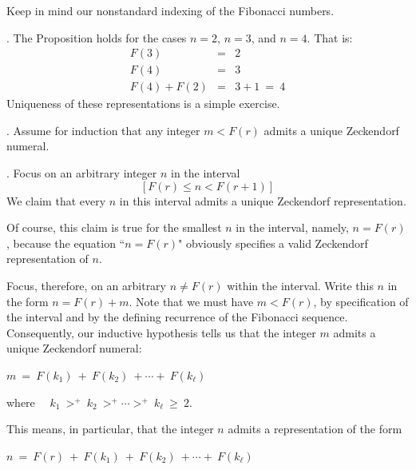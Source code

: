\smallskip

Keep in mind our nonstandard indexing of the Fibonacci numbers.

\medskip

.
The Proposition holds for the cases $n=2$, $n=3$, and $n=4$.  That is:
\begin{eqnarray*}
F(3) & = & 2 \\
F(4) & = & 3 \\
F(4) + F(2) & = & 3 + 1 \ = \ 4
\end{eqnarray*}
Uniqueness of these representations is a simple exercise.

\medskip

.
Assume for induction that any integer $m < F(r)$ admits a unique Zeckendorf numeral.

\medskip

.
Focus on an arbitrary integer $n$ in the interval
\[ [F(r) \leq n < F(r+1)] \]
We claim that every $n$ in this interval admits a unique Zeckendorf representation.

\smallskip

Of course, this claim is true for the smallest $n$ in the interval, namely, $n=F(r)$, because the equation ``$n=F(r)$" obviously specifies a valid Zeckendorf representation of $n$.

\smallskip

Focus, therefore, on an arbitrary $n \neq F(r)$ within the interval.  Write this $n$ in the form $n = F(r) + m$.  Note that we must have $m < F(r)$, by specification of the interval and by the defining recurrence of the Fibonacci sequence.  Consequently, our inductive hypothesis tells us that the integer $m$ admits a unique Zeckendorf numeral:

\smallskip

\hspace*{.25in} $m \ = \ F(k_1) \ + \ F(k_2) \ + \cdots + \ F(k_\ell)$

\smallskip

\noindent
where \ \ $k_1 \ >^+ \ k_2 \ >^+ \cdots >^+ \ k_\ell \ \geq \ 2$.

\smallskip

\noindent
This means, in particular, that the integer $n$ admits a representation of the form

\smallskip

\hspace*{.25in} $n \ = \ F(r) \ + \ F(k_1) \ + \ F(k_2) \ + \cdots + \ F(k_\ell)$

